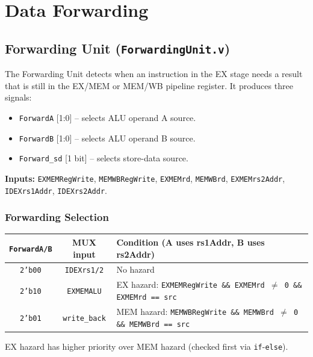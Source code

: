 \documentclass[12pt,a4paper]{article}
\begin{document}
\section{Data Forwarding}

\subsection{Forwarding Unit (\texttt{ForwardingUnit.v})}

The Forwarding Unit detects when an instruction in the EX stage needs a result that is still in the EX/MEM or MEM/WB pipeline register. It produces three signals:

\begin{itemize}
    \item \texttt{ForwardA} [1:0] -- selects ALU operand A source.
    \item \texttt{ForwardB} [1:0] -- selects ALU operand B source.
    \item \texttt{Forward\_sd} [1 bit] -- selects store-data source.
\end{itemize}

\textbf{Inputs:} \texttt{EXMEMRegWrite}, \texttt{MEMWBRegWrite}, \texttt{EXMEMrd}, \texttt{MEMWBrd}, \texttt{EXMEMrs2Addr}, \texttt{IDEXrs1Addr}, \texttt{IDEXrs2Addr}.

\subsubsection{Forwarding Selection}
\begin{center}
\begin{tabular}{ccp{8cm}} 
    \toprule
    \textbf{\texttt{ForwardA/B}} & \textbf{MUX input} & \textbf{Condition (A uses rs1Addr, B uses rs2Addr)} \\
    \midrule
    \texttt{2'b00} & \texttt{IDEXrs1/2} & No hazard \\
    \addlinespace
    \texttt{2'b10} & \texttt{EXMEMALU} & EX hazard: \texttt{EXMEMRegWrite \&\& EXMEMrd $\neq$ 0 \&\& EXMEMrd == src} \\
    \addlinespace
    \texttt{2'b01} & \texttt{write\_back} & MEM hazard: \texttt{MEMWBRegWrite \&\& MEMWBrd $\neq$ 0 \&\& MEMWBrd == src} \\
    \bottomrule
\end{tabular}
\end{center}
EX hazard has higher priority over MEM hazard (checked first via \texttt{if}-\texttt{else}).
\end{document}
